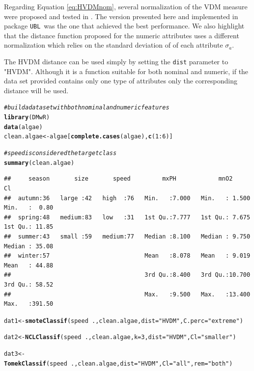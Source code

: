 \documentclass[10pt,a4paper]{article}\usepackage[]{graphicx}\usepackage[]{color}
\makeatletter
\newcommand{\hlnum}[1]{\textcolor[rgb]{0.686,0.059,0.569}{#1}}%
\newcommand{\hlstr}[1]{\textcolor[rgb]{0.192,0.494,0.8}{#1}}%
\newcommand{\hlcom}[1]{\textcolor[rgb]{0.678,0.584,0.686}{\textit{#1}}}%
\newcommand{\hlopt}[1]{\textcolor[rgb]{0,0,0}{#1}}%
\newcommand{\hlstd}[1]{\textcolor[rgb]{0.345,0.345,0.345}{#1}}%
\newcommand{\hlkwb}[1]{\textcolor[rgb]{0.69,0.353,0.396}{#1}}%
\newcommand{\hlkwc}[1]{\textcolor[rgb]{0.333,0.667,0.333}{#1}}%
\newcommand{\hlkwd}[1]{\textcolor[rgb]{0.737,0.353,0.396}{\textbf{#1}}}%
\newenvironment{kframe}{%
 \def\at@end@of@kframe{}%
 \ifinner\ifhmode%
  \def\at@end@of@kframe{\end{minipage}}%
  \begin{minipage}{\columnwidth}%
 \fi\fi%
 \def\FrameCommand##1{\hskip\@totalleftmargin \hskip-\fboxsep
 \colorbox{shadecolor}{##1}\hskip-\fboxsep
     \hskip-\linewidth \hskip-\@totalleftmargin \hskip\columnwidth}%
 \MakeFramed {\advance\hsize-\width
   \@totalleftmargin\z@ \linewidth\hsize
   \@setminipage}}%
 {\par\unskip\endMakeFramed%
 \at@end@of@kframe}
\newenvironment{knitrout}{}{} %
\newcommand{\UBL}{package \texttt{UBL}\ }
\makeatother
\begin{document}
Regarding Equation \ref{eq:HVDMnom}, several normalization of the VDM measure were proposed and tested in \cite{wilson1997improved}. The version presented here and implemented in \UBL was the one that achieved the best performance. We also highlight that the distance function proposed for the numeric attributes uses a different normalization which relies on the standard deviation of of each attribute $\sigma_a$.


The HVDM distance can be used simply by setting the \texttt{dist} parameter to "HVDM". Although it is a function suitable for both nominal and numeric, if the data set provided contains only one type of attributes only the corresponding distance will be used.



\begin{knitrout}\footnotesize
{}\color{fgcolor}\begin{kframe}
\begin{alltt}
\hlcom{# build a data set with both nominal and numeric features}
\hlkwd{library}\hlstd{(DMwR)}
\hlkwd{data}\hlstd{(algae)}
\hlstd{clean.algae} \hlkwb{<-} \hlstd{algae[}\hlkwd{complete.cases}\hlstd{(algae),}\hlkwd{c}\hlstd{(}\hlnum{1}\hlopt{:}\hlnum{6}\hlstd{)]}

\hlcom{# speed is considered the target class}
\hlkwd{summary}\hlstd{(clean.algae)}
\end{alltt}
\begin{verbatim}
##     season       size       speed         mxPH            mnO2              Cl        
##  autumn:36   large :42   high  :76   Min.   :7.000   Min.   : 1.500   Min.   :  0.80  
##  spring:48   medium:83   low   :31   1st Qu.:7.777   1st Qu.: 7.675   1st Qu.: 11.85  
##  summer:43   small :59   medium:77   Median :8.100   Median : 9.750   Median : 35.08  
##  winter:57                           Mean   :8.078   Mean   : 9.019   Mean   : 44.88  
##                                      3rd Qu.:8.400   3rd Qu.:10.700   3rd Qu.: 58.52  
##                                      Max.   :9.500   Max.   :13.400   Max.   :391.50
\end{verbatim}
\begin{alltt}
\hlstd{dat1} \hlkwb{<-} \hlkwd{smoteClassif}\hlstd{(speed}\hlopt{~}\hlstd{., clean.algae,} \hlkwc{dist}\hlstd{=}\hlstr{"HVDM"}\hlstd{,} \hlkwc{C.perc}\hlstd{=}\hlstr{"extreme"}\hlstd{)}

\hlstd{dat2} \hlkwb{<-} \hlkwd{NCLClassif}\hlstd{(speed}\hlopt{~}\hlstd{., clean.algae,} \hlkwc{k}\hlstd{=}\hlnum{3}\hlstd{,} \hlkwc{dist}\hlstd{=}\hlstr{"HVDM"}\hlstd{,} \hlkwc{Cl}\hlstd{=}\hlstr{"smaller"}\hlstd{)}

\hlstd{dat3} \hlkwb{<-} \hlkwd{TomekClassif}\hlstd{(speed}\hlopt{~}\hlstd{., clean.algae,} \hlkwc{dist}\hlstd{=}\hlstr{"HVDM"}\hlstd{,} \hlkwc{Cl}\hlstd{=}\hlstr{"all"}\hlstd{,} \hlkwc{rem}\hlstd{=}\hlstr{"both"}\hlstd{)}
\end{alltt}
\end{kframe}
\end{knitrout}
\end{document}
